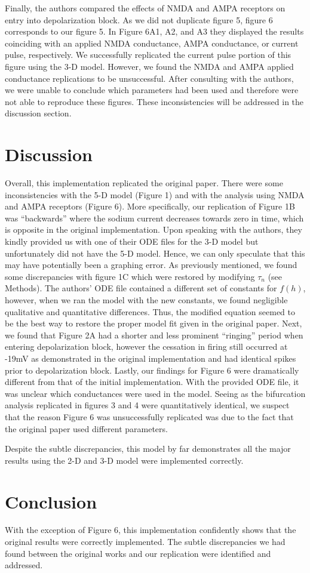Finally, the authors compared the effects of NMDA and AMPA receptors on entry into depolarization block. As we did not duplicate figure 5, figure 6 corresponds to our figure 5. In Figure 6A1, A2, and A3 they displayed the results coinciding with an applied NMDA conductance, AMPA conductance, or current pulse, respectively. We successfully replicated the current pulse portion of this figure using the 3-D model. However, we found the NMDA and AMPA applied conductance replications to be unsuccessful. After consulting with the authors, we were unable to conclude which parameters had been used and therefore were not able to reproduce these figures. These inconsistencies will be addressed in the discussion section.  

\section{Discussion}

Overall, this implementation replicated the original paper. There were some inconsistencies with the 5-D model (Figure 1) and with the analysis using NMDA and AMPA receptors (Figure 6). More specifically, our replication of Figure 1B was “backwards” where the sodium current decreases towards zero in time, which is opposite in the original implementation. Upon speaking with the authors, they kindly provided us with one of their ODE files for the 3-D model but unfortunately did not have the 5-D model. Hence, we can only speculate that this may have potentially been a graphing error. As previously mentioned, we found some discrepancies with figure 1C which were restored by modifying $\tau_n$  (see Methods). The authors’ ODE file contained a different set of constants for $f(h)$, however, when we ran the model with the new constants, we found negligible qualitative and quantitative differences.  Thus, the modified equation seemed to be the best way to restore the proper model fit given in the original paper. Next, we found that Figure 2A had a shorter and less prominent “ringing” period when entering depolarization block, however the cessation in firing still occurred at -19mV as demonstrated in the original implementation and had identical spikes prior to depolarization block. Lastly, our findings for Figure 6 were dramatically different from that of the initial implementation. With the provided ODE file, it was unclear which conductances were used in the model. Seeing as the bifurcation analysis replicated in figures 3 and 4 were quantitatively identical, we suspect that the reason Figure 6 was unsuccessfully replicated was due to the fact that the original paper used different parameters.

Despite the subtle discrepancies, this model by far demonstrates all the major results using the 2-D and 3-D model were implemented correctly. 

\section{Conclusion}

With the exception of Figure 6, this implementation confidently shows that the original results were correctly implemented. The subtle discrepancies we had found between the original works and our replication were identified and addressed.  
